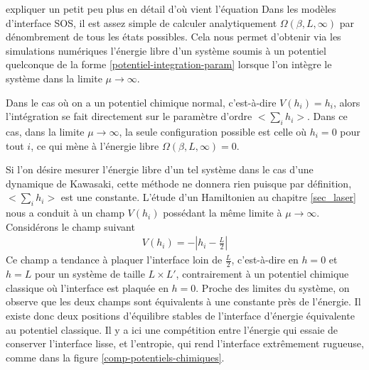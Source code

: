 {\color{red} expliquer un petit peu plus en détail d'où vient l'équation}
Dans les modèles d'interface SOS, il est assez simple de calculer analytiquement $\Omega(\beta,L,\infty)$ par dénombrement de tous les états possibles. Cela nous permet d'obtenir via les simulations numériques l'énergie libre d'un système soumis à un potentiel quelconque de la forme \ref{potentiel-integration-param} lorsque l'on intègre le système dans la limite $\mu \to \infty$.

Dans le cas où on a un potentiel chimique normal, c'est-à-dire $V(h_i)= h_i$, alors l'intégration se fait directement sur le paramètre d'ordre $<\sum_i h_i>$. Dans ce cas, dans la limite $\mu \to \infty$, la seule configuration possible est celle où $h_i=0$ pour tout $i$, ce qui mène à l'énergie libre $\Omega(\beta,L,\infty) = 0$. 

Si l'on désire mesurer l'énergie libre d'un tel système dans le cas d'une dynamique de Kawasaki, cette méthode ne donnera rien puisque par définition, $<\sum_i h_i>$ est une constante. L'étude d'un Hamiltonien au chapitre \ref{sec_laser} nous a conduit à un champ $V(h_i)$ possédant la même limite à $\mu \to \infty$. Considérons le champ suivant
\begin{align}
    V(h_i) = - |h_i-\frac{L}{2}|
    \label{neggstaged}
\end{align}
Ce champ a tendance à plaquer l'interface loin de $\frac{L}{2}$, c'est-à-dire en $h=0$ et $h=L$ pour un système de taille $L\times L'$, contrairement à un potentiel chimique classique où l'interface est plaquée en $h=0$. Proche des limites du système, on observe que les deux champs sont équivalents à une constante près de l'énergie. Il existe donc deux positions d'équilibre stables de l'interface d'énergie équivalente au potentiel classique. Il y a ici une compétition entre l'énergie qui essaie de conserver l'interface lisse, et l'entropie, qui rend l'interface extrêmement rugueuse, comme dans la figure \ref{comp-potentiels-chimiques}.

